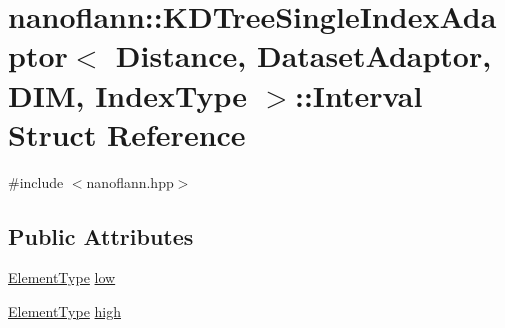 \hypertarget{structnanoflann_1_1_k_d_tree_single_index_adaptor_1_1_interval}{\section{nanoflann\-:\-:K\-D\-Tree\-Single\-Index\-Adaptor$<$ Distance, Dataset\-Adaptor, D\-I\-M, Index\-Type $>$\-:\-:Interval Struct Reference}
\label{structnanoflann_1_1_k_d_tree_single_index_adaptor_1_1_interval}
}


{\ttfamily \#include $<$nanoflann.\-hpp$>$}

\subsection*{Public Attributes}
\begin{DoxyCompactItemize}
\item 
\hyperlink{classnanoflann_1_1_k_d_tree_single_index_adaptor_a21652a3919382d558291f80cefad8770}{Element\-Type} \hyperlink{structnanoflann_1_1_k_d_tree_single_index_adaptor_1_1_interval_a96020845859d090c3f46f1656faeb45d}{low}
\item 
\hyperlink{classnanoflann_1_1_k_d_tree_single_index_adaptor_a21652a3919382d558291f80cefad8770}{Element\-Type} \hyperlink{structnanoflann_1_1_k_d_tree_single_index_adaptor_1_1_interval_a5b1d4df37a01d6a2154cb89dbd53456e}{high}
\end{DoxyCompactItemize}


